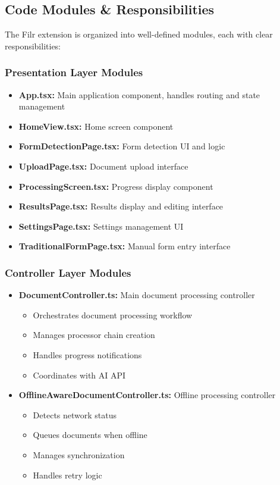 \documentclass[11pt, a4paper]{article}
\theoremstyle{plain}
\theoremstyle{definition}
\begin{document}
\subsection{Code Modules \& Responsibilities}

The Filr extension is organized into well-defined modules, each with clear responsibilities:

\subsubsection{Presentation Layer Modules}

\begin{itemize}
    \item \textbf{App.tsx:} Main application component, handles routing and state management
    \item \textbf{HomeView.tsx:} Home screen component
    \item \textbf{FormDetectionPage.tsx:} Form detection UI and logic
    \item \textbf{UploadPage.tsx:} Document upload interface
    \item \textbf{ProcessingScreen.tsx:} Progress display component
    \item \textbf{ResultsPage.tsx:} Results display and editing interface
    \item \textbf{SettingsPage.tsx:} Settings management UI
    \item \textbf{TraditionalFormPage.tsx:} Manual form entry interface
\end{itemize}

\subsubsection{Controller Layer Modules}

\begin{itemize}
    \item \textbf{DocumentController.ts:} Main document processing controller
    \begin{itemize}
        \item Orchestrates document processing workflow
        \item Manages processor chain creation
        \item Handles progress notifications
        \item Coordinates with AI API
    \end{itemize}
    
    \item \textbf{OfflineAwareDocumentController.ts:} Offline processing controller
    \begin{itemize}
        \item Detects network status
        \item Queues documents when offline
        \item Manages synchronization
        \item Handles retry logic
    \end{itemize}
\end{itemize}
\end{document}

